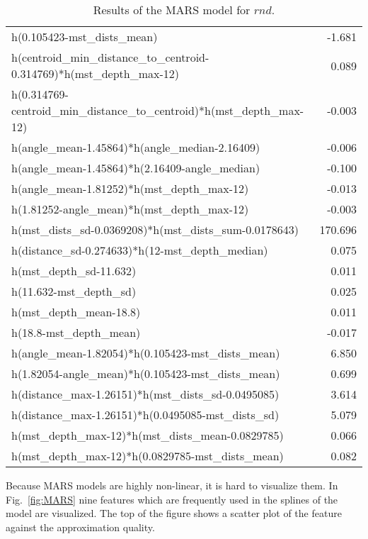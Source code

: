 \documentclass{article}
\begin{document}
\begin{table}
\begin{tabular}{lr}
  h(0.105423-mst\_dists\_mean) & -1.681 \\ 
  h(centroid\_min\_distance\_to\_centroid-0.314769)*h(mst\_depth\_max-12) & 0.089 \\ 
  h(0.314769-centroid\_min\_distance\_to\_centroid)*h(mst\_depth\_max-12) & -0.003 \\ 
  h(angle\_mean-1.45864)*h(angle\_median-2.16409) & -0.006 \\ 
  h(angle\_mean-1.45864)*h(2.16409-angle\_median) & -0.100 \\ 
  h(angle\_mean-1.81252)*h(mst\_depth\_max-12) & -0.013 \\ 
  h(1.81252-angle\_mean)*h(mst\_depth\_max-12) & -0.003 \\ 
  h(mst\_dists\_sd-0.0369208)*h(mst\_dists\_sum-0.0178643) & 170.696 \\ 
  h(distance\_sd-0.274633)*h(12-mst\_depth\_median) & 0.075 \\ 
  h(mst\_depth\_sd-11.632) & 0.011 \\ 
  h(11.632-mst\_depth\_sd) & 0.025 \\ 
  h(mst\_depth\_mean-18.8) & 0.011 \\ 
  h(18.8-mst\_depth\_mean) & -0.017 \\ 
  h(angle\_mean-1.82054)*h(0.105423-mst\_dists\_mean) & 6.850 \\ 
  h(1.82054-angle\_mean)*h(0.105423-mst\_dists\_mean) & 0.699 \\ 
  h(distance\_max-1.26151)*h(mst\_dists\_sd-0.0495085) & 3.614 \\ 
  h(distance\_max-1.26151)*h(0.0495085-mst\_dists\_sd) & 5.079 \\ 
  h(mst\_depth\_max-12)*h(mst\_dists\_mean-0.0829785) & 0.066 \\ 
  h(mst\_depth\_max-12)*h(0.0829785-mst\_dists\_mean) & 0.082 \\ 
   \bottomrule
\end{tabular}
   \caption{Results of the MARS model for $rnd$.}
  \label{tab:MARS}
\end{table}

Because MARS models are highly non-linear, it is hard to visualize
them. In Fig.~\ref{fig:MARS} nine features which are frequently used
in the splines of the model are visualized. The top of the figure
shows a scatter plot of the feature against the approximation
quality.
\end{document}
